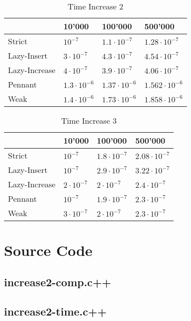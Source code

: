 \documentclass{DIKU-article}[2010/01/13]
\begin{document}
\begin{table}[h!]
\centering
\caption{Time Increase 2}
\begin{tabular}{l|lll}
& 10'000 & 100'000 & 500'000 \\
\hline
Strict & $10^{-7}$ & $1.1\cdot 10^{-7}$ & $1.28\cdot 10^{-7}$\\
Lazy-Insert & $3\cdot 10^{-7}$ & $4.3\cdot 10^{-7}$ & $4.54\cdot 10^{-7}$\\
Lazy-Increase & $4\cdot 10^{-7}$ & $3.9\cdot 10^{-7}$ & $4.06\cdot 10^{-7}$\\
Pennant & $1.3\cdot 10^{-6}$ & $1.37\cdot 10^{-6}$ & $1.562\cdot 10^{-6}$\\
Weak & $1.4\cdot 10^{-6}$ & $1.73\cdot 10^{-6}$ & $1.858\cdot 10^{-6}$

\end{tabular}
\end{table}

\begin{table}[h!]
\centering
\caption{Time Increase 3}
\begin{tabular}{l|lll}
\label{tab:time.last}
& 10'000 & 100'000 & 500'000 \\
\hline
Strict & $10^{-7}$ & $1.8\cdot 10^{-7}$ & $2.08\cdot 10^{-7}$\\
Lazy-Insert & $10^{-7}$ & $2.9\cdot 10^{-7}$ & $3.22\cdot 10^{-7}$\\
Lazy-Increase & $2\cdot 10^{-7}$ & $2\cdot 10^{-7}$ & $2.4\cdot 10^{-7}$\\
Pennant & $10^{-7}$ & $1.9\cdot 10^{-7}$ & $2.3\cdot 10^{-7}$\\
Weak & $3\cdot 10^{-7}$ & $2\cdot 10^{-7}$ & $2.3\cdot 10^{-7}$


\end{tabular}
\end{table}


\clearpage


\section{Source Code}
\subsection{increase2-comp.c++}


\subsection{increase2-time.c++}

\end{document}
